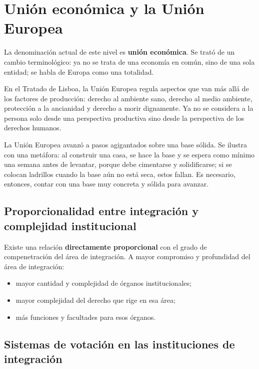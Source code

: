 \documentclass[12pt,oneside]{book}
\begin{document}
\section{Unión económica y la Unión Europea}

La denominación actual de este nivel es \textbf{unión económica}. Se trató de un cambio terminológico: ya no se trata de una economía en común, sino de una sola entidad; se habla de Europa como una totalidad.

\begin{note}
En el Tratado de Lisboa, la Unión Europea regula aspectos que van más allá de los factores de producción: derecho al ambiente sano, derecho al medio ambiente, protección a la ancianidad y derecho a morir dignamente. Ya no se considera a la persona solo desde una perspectiva productiva sino desde la perspectiva de los derechos humanos.
\end{note}

La Unión Europea avanzó a pasos agigantados sobre una base sólida. Se ilustra con una metáfora: al construir una casa, se hace la base y se espera como mínimo una semana antes de levantar, porque debe cimentarse y solidificarse; si se colocan ladrillos cuando la base aún no está seca, estos fallan. Es necesario, entonces, contar con una base muy concreta y sólida para avanzar.

\subsection{Proporcionalidad entre integración y complejidad institucional}

\begin{important}
Existe una relación \textbf{directamente proporcional} con el grado de compenetración del área de integración. A mayor compromiso y profundidad del área de integración:
\begin{itemize}
    \item mayor cantidad y complejidad de órganos institucionales;
    \item mayor complejidad del derecho que rige en esa área;
    \item más funciones y facultades para esos órganos.
\end{itemize}
\end{important}

\subsection{Sistemas de votación en las instituciones de integración}
\end{document}
